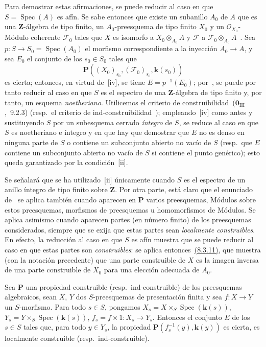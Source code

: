 Para demostrar estas afirmaciones, se puede reducir al caso en que $S=\operatorname{Spec}(A)$ es afín.
Se sabe entonces que existe un subanillo $A_0$ de $A$ que es una $\mathbf Z$-álgebra de tipo finito, un $A_0$-preesquema de tipo finito $X_0$ y un $\mathcal O_{X_0}$-Módulo coherente $\mathcal F_0$ tales que $X$ es isomorfo a $X_0\otimes_{A_0}A$ y $\mathcal F$ a $\mathcal F_0\otimes_{A_0}A$~.
Sea $p:S\to S_0=\operatorname{Spec}(A_0)$ el morfismo correspondiente a la inyección $A_0\to A$, y sea $E_0$ el conjunto de los $s_0\in S_0$ tales que
\[
\boldsymbol{P}((X_0)_{s_0},(\mathcal F_0)_{s_0},\boldsymbol{k}(s_0))
\]
es cierta; entonces, en virtud de~[iv], se tiene $E=p^{-1}(E_0)$; por~, se puede por tanto reducir al caso en que $S$ es el espectro de una $\mathbf Z$-álgebra de tipo finito y, por tanto, un esquema \emph{noetheriano}.
Utilicemos el criterio de construibilidad~($\mathbf{0}_{\mathrm{III}}$,~9.2.3) (resp.\ el criterio de ind-construibilidad~); empleando~[iv] como antes y sustituyendo $S$ por un subesquema cerrado \emph{íntegro} de $S$, se reduce al caso en que $S$ es noetheriano e íntegro y en que hay que demostrar que $E$ no es denso en ninguna parte de $S$ o contiene un subconjunto abierto no vacío de $S$ (resp.\ que $E$ contiene un subconjunto abierto no vacío de $S$ si contiene el punto genérico); esto queda garantizado por la condición~[ii].

Se señalará que se ha utilizado~[ii] únicamente cuando $S$ es el espectro de un anillo íntegro de tipo finito sobre $\mathbf Z$.
Por otra parte, está claro que el enunciado de~ se aplica también cuando aparecen en $\boldsymbol{P}$ varios preesquemas, Módulos sobre estos preesquemas, morfismos de preesquemas u homomorfismos de Módulos.
Se aplica asimismo cuando aparecen partes (en número finito) de los preesquemas considerados, siempre que se exija que estas partes sean \emph{localmente construibles}.
En efecto, la reducción al caso en que $S$ es afín muestra que se puede reducir al caso en que estas partes son \emph{construibles}: se aplica entonces~{\hyperlink{ega4.c04.thm.8-3-11}{(8.3.11)}}, que muestra (con la notación precedente) que una parte construible de $X$ es la imagen inversa de una parte construible de $X_0$ para una elección adecuada de $A_0$.

\begin{corollary}[9.2.4]
\label{IV.9.2.4}
Sea $\boldsymbol{P}$ una propiedad construible \textnormal{(resp.}\ ind-construible\textnormal{)} de los preesquemas algebraicos, sean $X$, $Y$ dos $S$-preesquemas de presentación finita y sea $f:X\to Y$ un $S$-morfismo.
Para todo $s\in S$, pongamos $X_s=X\times_S\operatorname{Spec}(\boldsymbol{k}(s))$, $Y_s=Y\times_S\operatorname{Spec}(\boldsymbol{k}(s))$, $f_s=f\times1:X_s\to Y_s$.
Entonces el conjunto $E$ de los $s\in S$ tales que, para todo $y\in Y_s$, la propiedad $\boldsymbol{P}(f_s^{-1}(y),\boldsymbol{k}(y))$ es cierta, es localmente construible \textnormal{(resp.}\ ind-construible\textnormal{)}.
\end{corollary}

